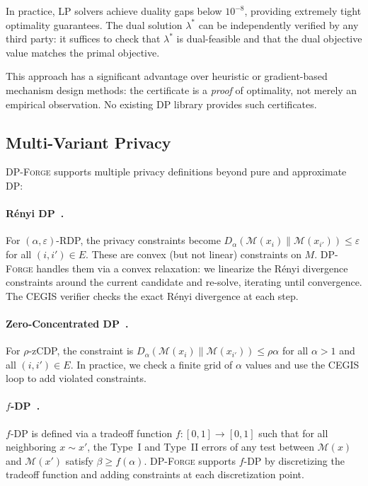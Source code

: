 \documentclass[11pt,a4paper]{article}
\newcommand{\dpforge}{\textsc{DP-Forge}}
\newcommand{\eps}{\varepsilon}
\newcommand{\cM}{\mathcal{M}}
\begin{document}
In practice, LP solvers achieve duality gaps below $10^{-8}$, providing
extremely tight optimality guarantees.  The dual solution $\lambda^*$ can be
independently verified by any third party: it suffices to check that $\lambda^*$
is dual-feasible and that the dual objective value matches the primal objective.

This approach has a significant advantage over heuristic or gradient-based
mechanism design methods: the certificate is a \emph{proof} of optimality,
not merely an empirical observation.  No existing DP library provides such
certificates.

\subsection{Multi-Variant Privacy}
\label{subsec:multivariant}

\dpforge{} supports multiple privacy definitions beyond pure and approximate DP:

\paragraph{R\'enyi DP~\cite{mironov2017renyi}.}
For $(\alpha, \eps)$-RDP, the privacy constraints become
$D_\alpha(\cM(x_i) \| \cM(x_{i'})) \le \eps$ for all $(i,i') \in E$.
These are convex (but not linear) constraints on $M$.  \dpforge{} handles them
via a convex relaxation: we linearize the R\'enyi divergence constraints around
the current candidate and re-solve, iterating until convergence.  The CEGIS
verifier checks the exact R\'enyi divergence at each step.

\paragraph{Zero-Concentrated DP~\cite{bun2016concentrated}.}
For $\rho$-zCDP, the constraint is $D_\alpha(\cM(x_i) \| \cM(x_{i'})) \le \rho\alpha$
for all $\alpha > 1$ and all $(i,i') \in E$.  In practice, we check a finite
grid of $\alpha$ values and use the CEGIS loop to add violated constraints.

\paragraph{$f$-DP~\cite{dong2022gaussian}.}
$f$-DP is defined via a tradeoff function $f: [0,1] \to [0,1]$ such that
for all neighboring $x \sim x'$, the Type~I and Type~II errors of any test
between $\cM(x)$ and $\cM(x')$ satisfy $\beta \ge f(\alpha)$.  \dpforge{}
supports $f$-DP by discretizing the tradeoff function and adding constraints
at each discretization point.
\end{document}
